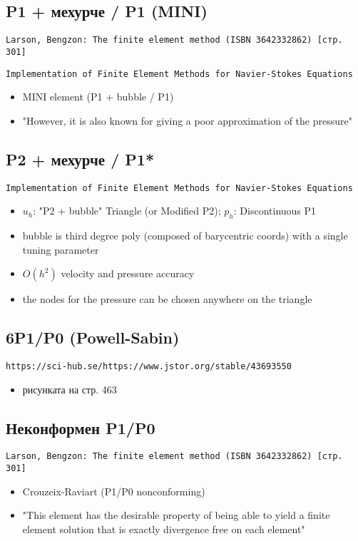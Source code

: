 \documentclass[fleqn,12pt]{article}
\begin{document}
\subsection{P1 + мехурче / P1 (MINI)}
\begin{verbatim}
Larson, Bengzon: The finite element method (ISBN 3642332862) [стр. 301] 
\end{verbatim}
\begin{verbatim}
Implementation of Finite Element Methods for Navier-Stokes Equations
\end{verbatim}

\begin{itemize}
    \item MINI element (P1 + bubble / P1)
    \item "However, it is also known for giving a poor approximation of the pressure"
\end{itemize}

\subsection{P2 + мехурче / P1*}
\begin{verbatim}
Implementation of Finite Element Methods for Navier-Stokes Equations
\end{verbatim}
\begin{itemize}
\item $u_h$: "P2 + bubble" Triangle (or Modified P2); $p_h$: Discontinuous P1
\item bubble is third degree poly (composed of barycentric coords) with a single tuning parameter
\item $O(h^2)$ velocity and pressure accuracy
\item the nodes for the pressure can be chosen anywhere on the triangle
\end{itemize}

\subsection{6P1/P0 (Powell-Sabin)}
\begin{verbatim}
https://sci-hub.se/https://www.jstor.org/stable/43693550
\end{verbatim}
\begin{itemize}
    \item рисунката на стр. 463
\end{itemize}

\subsection{Неконформен P1/P0}
\begin{verbatim}
Larson, Bengzon: The finite element method (ISBN 3642332862) [стр. 301] 
\end{verbatim}
\begin{itemize}
    \item Crouzeix-Raviart (P1/P0 nonconforming)
    \item "This element has the desirable property of being able to yield a finite
       element solution that is exactly divergence free on each element"

\end{itemize}
\end{document}
